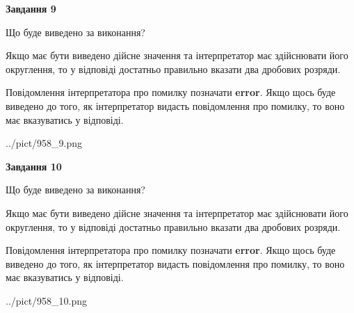 \documentclass[12pt, ukrainian]{article}
\begin{document}
{\begin {Large}
{\begin {center}\textbf{Завдання 9}\end {center}}\par
Що буде виведено за виконання? \par

Якщо має бути виведено дійсне значення та інтерпретатор має здійснювати його округлення, 
то у відповіді достатньо правильно вказати два дробових розряди.

Повідомлення інтерпретатора про помилку позначати \textbf{error}.
Якщо щось буде виведено до того, як інтерпретатор видасть повідомлення про помилку, 
то воно має вказуватись у відповіді. \par

\begin{center}
	{../pict/958_9.png}
\end{center}
\newpage

{\begin {center}\textbf{Завдання 10}\end {center}}\par
Що буде виведено за виконання? \par

Якщо має бути виведено дійсне значення та інтерпретатор має здійснювати його округлення, 
то у відповіді достатньо правильно вказати два дробових розряди.

Повідомлення інтерпретатора про помилку позначати \textbf{error}.
Якщо щось буде виведено до того, як інтерпретатор видасть повідомлення про помилку, 
то воно має вказуватись у відповіді. \par

\begin{center}
	{../pict/958_10.png}
\end{center}
\newpage

\end {Large}}
\end{document}
